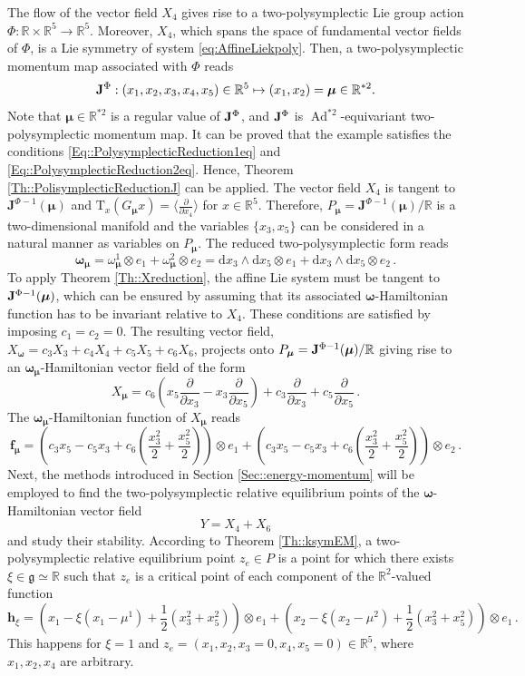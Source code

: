 \documentclass[11pt]{article}
\theoremstyle{plain}
\theoremstyle{definition}
\newcommand{\R}{\mathbb{R}}
\newcommand{\T}{\mathrm{T}}
\newcommand{\bomega}{{\boldsymbol{\omega}}}
\newcommand{\bh}{{\boldsymbol{h}}}
\renewcommand{\d}{\mathrm{d}}
\DeclareMathOperator{\Ad}{Ad}
\def\d{\mathrm{d}}
\numberwithin{equation}{section}
\begin{document}
The flow of the vector field $X_4$ gives rise to a two-polysymplectic Lie group action $\Phi:\R\times \R^5\rightarrow \R^5$. Moreover, $X_4$, which spans the space of fundamental vector fields of $\Phi$, is a Lie symmetry of system \eqref{eq:AffineLiekpoly}. Then, a two-polysymplectic momentum map associated with $\Phi$ reads
$$
{\bf J}^\Phi:(x_1,x_2,x_3,x_4,x_5)\in \mathbb{R}^5\mapsto (x_1,x_2)=\bm\mu\in \mathbb{R}^{*2}.
$$
Note that $\bm\mu\in \R^{*2}$ is a regular value of ${\bf J}^\Phi$, and ${\bf J}^\Phi$ is $\Ad^{*2}$-equivariant two-polysymplectic momentum map. It can be proved that the example satisfies the conditions \eqref{Eq::PolysymplecticReduction1eq} and \eqref{Eq::PolysymplecticReduction2eq}. Hence, Theorem \ref{Th::PolisymplecticReductionJ} can be applied. The vector field $X_4$ is tangent to $\mathbf{J}^{\Phi-1}(\bm \mu)$ and $\T_x(G_{\bm\mu}x)=\langle \frac{\partial}{\partial x_4}\rangle$ for $x\in \R^5$. Therefore, $P_{\bm\mu}=\mathbf{J}^{\Phi-1}(\bm \mu)/\mathbb{R}$ is a two-dimensional manifold and the variables $\{x_3,x_5\}$ can be considered in a natural manner as variables on $P_{\bm\mu}$. The reduced two-polysymplectic form reads
$$
\bm\omega_{\bm\mu}=
\omega^1_{\bm \mu}\otimes e_1+\omega^2_{\bm \mu}\otimes e_2=\d x_3\wedge \d x_5\otimes e_1+\d x_3\wedge \d x_5\otimes e_2\,.
$$
To apply Theorem \ref{Th::Xreduction}, the affine Lie system must be tangent to ${\bf J}^{\Phi-1}(\bm\mu)$, which can be ensured by assuming that its associated $\bm\omega$-Hamiltonian function has to be invariant relative to $X_4$. These conditions are satisfied by imposing $c_1=c_2=0$. The resulting vector field, $X_\bomega=c_3X_3+c_4X_4+c_5X_5+c_6X_6$, projects onto $P_{\bm\mu}= {\bf J}^{\Phi-1}(\bm\mu)/\mathbb{R}$ giving rise to an $\bm\omega_{\bm\mu}$-Hamiltonian vector field of the form 
$$
X_{{\bm \mu}}=c_6\left(x_5\frac{\partial}{\partial x_3}-x_3\frac{\partial}{\partial x_5}\right)+c_3\frac{\partial}{\partial x_3} + c_5\frac{\partial}{\partial x_5}\,.
$$
The $\bm\omega_{\bm \mu}$-Hamiltonian function of $X_{\bm\mu}$ reads
$$
\boldsymbol{f}_{\bm \mu}=\left(c_3x_5-c_5x_3+c_6\left(\frac{x_3^2}{2}+\frac{x_5^2}{2}\right)\right)\otimes e_1+\left(c_3x_5-c_5x_3+c_6\left(\frac{x_3^2}{2}+\frac{x_5^2}{2}\right)\right)\otimes e_2\,.
$$
Next, the methods introduced in Section \ref{Sec::energy-momentum} will be employed to find the two-polysymplectic relative equilibrium points of the $\bm\omega$-Hamiltonian vector field 
\[
Y=X_4+X_6
\]
and study their stability.
According to Theorem \ref{Th::ksymEM}, a two-polysymplectic relative equilibrium point $z_e\in P$ is a point for which there exists $\xi\in\mathfrak{g}\simeq\R$ such that $z_e$ is a critical point of each component of the $\R^2$-valued function 
\[
\bh_\xi=\left(x_1-\xi(x_1-\mu^1)+\frac{1}{2}(x_3^2+x_5^2)\right)\otimes e_1+\left(x_2-\xi(x_2-\mu^2)+\frac{1}{2}(x_3^2+x_5^2)\right)\otimes e_1\,.
\]
This happens for $\xi=1$ and $z_e=(x_1,x_2,x_3=0,x_4,x_5=0)\in\R^5$, where $x_1,x_2,x_4$ are arbitrary.
\end{document}
